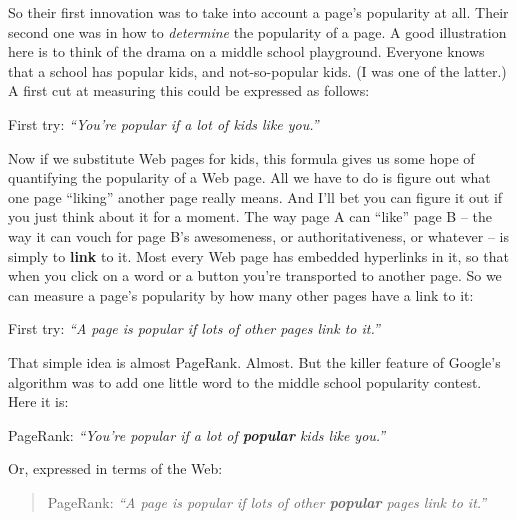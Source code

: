 \begin{alttitles}
So their first innovation was to take into account a page's popularity at all.
Their second one was in how to \textit{determine} the popularity of a page. A
good illustration here is to think of the drama on a middle school playground.
Everyone knows that a school has popular kids, and not-so-popular kids. (I
was one of the latter.) A first cut at measuring this could be expressed as
follows:

\vspace{-.1in}
\begin{center}
First try: \textit{``You're popular if a lot of kids like you.''}
\end{center}


Now if we substitute Web pages for kids, this formula gives us some hope of
quantifying the popularity of a Web page. All we have to do is figure out what
one page ``liking'' another page really means. And I'll bet you can figure it
out if you just think about it for a moment. The way page A can ``like'' page B
-- the way it can vouch for page B's awesomeness, or authoritativeness, or
whatever -- is simply to \textbf{link} to it. Most every Web page has embedded
hyperlinks in it, so that when you click on a word or a button you're
transported to another page. So we can measure a page's popularity by how many
other pages have a link to it:

\vspace{-.1in}
\begin{center}
First try: \textit{``A page is popular if lots of other pages link to it.''}
\end{center}

That simple idea is almost PageRank. Almost. But the killer feature of Google's
algorithm was to add one little word to the middle school popularity contest.
Here it is:

\vspace{-.1in}
\begin{center}
PageRank: \textit{``You're popular if a lot of \textbf{popular} kids like you.''}
\end{center}

Or, expressed in terms of the Web:

\vspace{-.1in}
\begin{quote}
PageRank: \textit{``A page is popular if lots of other \textbf{popular} pages link to it.''}
\end{quote}


\end{alttitles}
